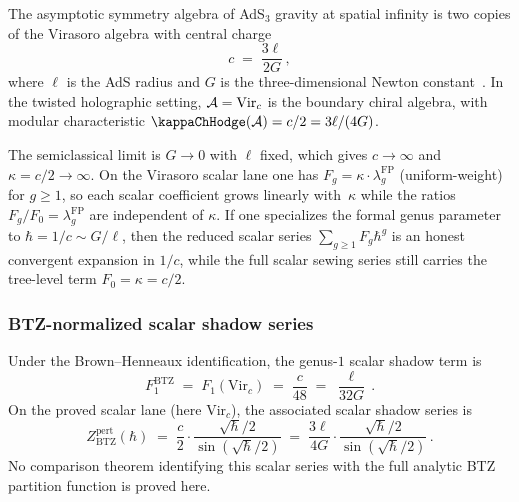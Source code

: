 \begin{setup}
\label{setup:thqg-I-brown-henneaux}
The asymptotic symmetry algebra of AdS$_3$ gravity at spatial infinity is two copies of the Virasoro algebra with central charge
\begin{equation}%
c \;=\; \frac{3\ell}{2G}\,,
\end{equation}
where $\ell$ is the AdS radius and $G$ is the three-dimensional Newton constant~\cite{BH86}. In the twisted holographic setting, $\mathcal{A} = \mathrm{Vir}_c$ is the boundary chiral algebra, with modular characteristic $\kappaChHodge(\cA) = c/2 = 3\ell/(4G)$.
\end{setup}

\begin{remark}
The semiclassical limit is $G \to 0$ with $\ell$ fixed, which gives
$c \to \infty$ and $\kappa=c/2 \to \infty$. On the Virasoro scalar
lane one has $F_g = \kappa \cdot \lambda_g^{\mathrm{FP}}$
\textup{(}uniform-weight\textup{)} for $g \geq
1$, so each scalar coefficient grows linearly with~$\kappa$ while the
ratios $F_g/F_0 = \lambda_g^{\mathrm{FP}}$ are independent of
$\kappa$. If one specializes the formal genus parameter to
$\hbar = 1/c \sim G/\ell$, then the reduced scalar series
$\sum_{g \geq 1} F_g \hbar^g$ is an honest convergent expansion in
$1/c$, while the full scalar sewing series still carries the
tree-level term $F_0=\kappa=c/2$.
\end{remark}

\subsubsection{BTZ-normalized scalar shadow series}

\begin{theorem}
Under the Brown--Henneaux identification, the genus-$1$ scalar shadow
term is
\begin{equation}%
F_1^{\mathrm{BTZ}} \;=\; F_1(\mathrm{Vir}_c) \;=\; \frac{c}{48} \;=\; \frac{\ell}{32G}\,.
\end{equation}
On the proved scalar lane \textup{(}here $\mathrm{Vir}_c$\textup{)}, the
associated scalar shadow series is
\begin{equation}%
Z_{\mathrm{BTZ}}^{\mathrm{pert}}(\hbar) \;=\; \frac{c}{2} \cdot \frac{\sqrt{\hbar}/2}{\sin(\sqrt{\hbar}/2)} \;=\; \frac{3\ell}{4G} \cdot \frac{\sqrt{\hbar}/2}{\sin(\sqrt{\hbar}/2)}\,.
\end{equation}
No comparison theorem identifying this scalar series with the full
analytic BTZ partition function is proved here.
\end{theorem}

